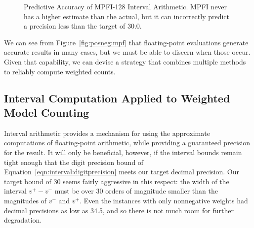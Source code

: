 \documentclass[
hf
]{ceurart}
\newcommand{\vmin}{v^{-}}
\newcommand{\vmax}{v^{+}}
\begin{document}
\begin{figure}
\caption{Predictive Accuracy of MPFI-128 Interval Arithmetic.  MPFI never has a higher estimate than the actual, but it can
incorrectly predict a precision less than the target of 30.0.}
\label{fig:mpfi}
\end{figure}


We can see from Figure~\ref{fig:posneg:mpf} that floating-point
evaluations generate accurate results in many cases, but we must be
able to discern when those occur.  Given that capability, we can
devise a strategy that combines multiple methods
to reliably compute weighted counts.

\subsection{Interval Computation Applied to Weighted Model Counting}

Interval arithmetic provides a mechanism for using the approximate
computations of floating-point arithmetic, while providing a
guaranteed precision for the result.  It will only be beneficial,
however, if the interval bounds remain tight enough that the digit
precision bound of Equation~\ref{eqn:interval:digitprecision} meets
our target decimal precision.  Our target bound of 30 seems fairly
aggressive in this respect: the width of the interval $\vmax-\vmin$
must be over 30 orders of magnitude smaller than the magnitudes of
$\vmin$ and $\vmax$.  Even the instances with only nonnegative weights
had decimal precisions as low as 34.5, and so there is not much
room for further degradation.
\end{document}
